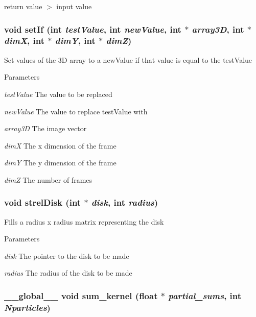 return value $>$ input value \hypertarget{ex__particle__CUDA__float_8cu_a0ee0664eb7123e026513e7cf19ba3434}{
\subsubsection[{setIf}]{\setlength{\rightskip}{0pt plus 5cm}void setIf (int {\em testValue}, \/  int {\em newValue}, \/  int $\ast$ {\em array3D}, \/  int $\ast$ {\em dimX}, \/  int $\ast$ {\em dimY}, \/  int $\ast$ {\em dimZ})}}
\label{ex__particle__CUDA__float_8cu_a0ee0664eb7123e026513e7cf19ba3434}
Set values of the 3D array to a newValue if that value is equal to the testValue 
\begin{DoxyParams}{Parameters}
\item[{\em testValue}]The value to be replaced \item[{\em newValue}]The value to replace testValue with \item[{\em array3D}]The image vector \item[{\em dimX}]The x dimension of the frame \item[{\em dimY}]The y dimension of the frame \item[{\em dimZ}]The number of frames \end{DoxyParams}
\hypertarget{ex__particle__CUDA__float_8cu_a2f03f766b1c044ea6bab007e1975a23f}{
\subsubsection[{strelDisk}]{\setlength{\rightskip}{0pt plus 5cm}void strelDisk (int $\ast$ {\em disk}, \/  int {\em radius})}}
\label{ex__particle__CUDA__float_8cu_a2f03f766b1c044ea6bab007e1975a23f}
Fills a radius x radius matrix representing the disk 
\begin{DoxyParams}{Parameters}
\item[{\em disk}]The pointer to the disk to be made \item[{\em radius}]The radius of the disk to be made \end{DoxyParams}
\hypertarget{ex__particle__CUDA__float_8cu_a72476d2a032e744c6b1c5835bec5a663}{
\subsubsection[{sum\_\-kernel}]{\setlength{\rightskip}{0pt plus 5cm}\_\-\_\-global\_\-\_\- void sum\_\-kernel (float $\ast$ {\em partial\_\-sums}, \/  int {\em Nparticles})}}
